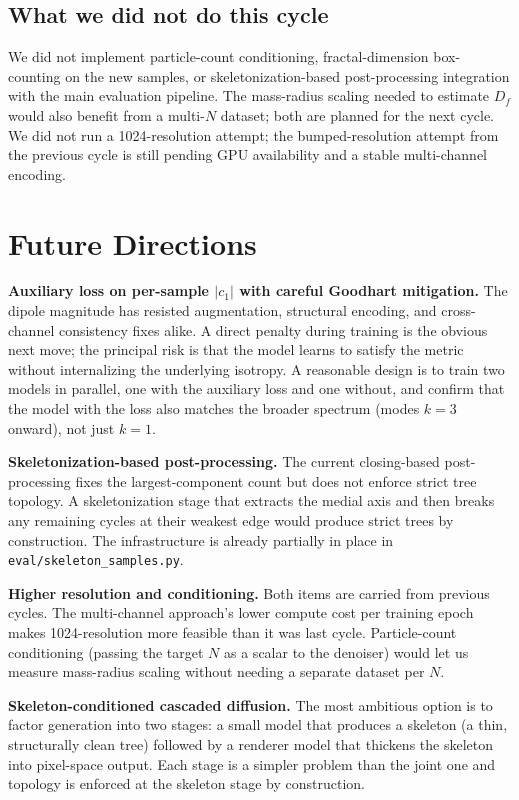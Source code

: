 \documentclass[11pt]{article}
\begin{document}
\subsection{What we did not do this cycle}

We did not implement particle-count conditioning, fractal-dimension box-counting on the new samples, or skeletonization-based post-processing integration with the main evaluation pipeline. The mass-radius scaling needed to estimate $D_f$ would also benefit from a multi-$N$ dataset; both are planned for the next cycle. We did not run a 1024-resolution attempt; the bumped-resolution attempt from the previous cycle is still pending GPU availability and a stable multi-channel encoding.

\section{Future Directions}

\textbf{Auxiliary loss on per-sample $|c_1|$ with careful Goodhart mitigation.} The dipole magnitude has resisted augmentation, structural encoding, and cross-channel consistency fixes alike. A direct penalty during training is the obvious next move; the principal risk is that the model learns to satisfy the metric without internalizing the underlying isotropy. A reasonable design is to train two models in parallel, one with the auxiliary loss and one without, and confirm that the model with the loss also matches the broader spectrum (modes $k = 3$ onward), not just $k = 1$.

\textbf{Skeletonization-based post-processing.} The current closing-based post-processing fixes the largest-component count but does not enforce strict tree topology. A skeletonization stage that extracts the medial axis and then breaks any remaining cycles at their weakest edge would produce strict trees by construction. The infrastructure is already partially in place in \texttt{eval/skeleton\_samples.py}.

\textbf{Higher resolution and conditioning.} Both items are carried from previous cycles. The multi-channel approach's lower compute cost per training epoch makes 1024-resolution more feasible than it was last cycle. Particle-count conditioning (passing the target $N$ as a scalar to the denoiser) would let us measure mass-radius scaling without needing a separate dataset per $N$.

\textbf{Skeleton-conditioned cascaded diffusion.} The most ambitious option is to factor generation into two stages: a small model that produces a skeleton (a thin, structurally clean tree) followed by a renderer model that thickens the skeleton into pixel-space output. Each stage is a simpler problem than the joint one and topology is enforced at the skeleton stage by construction.
\end{document}
